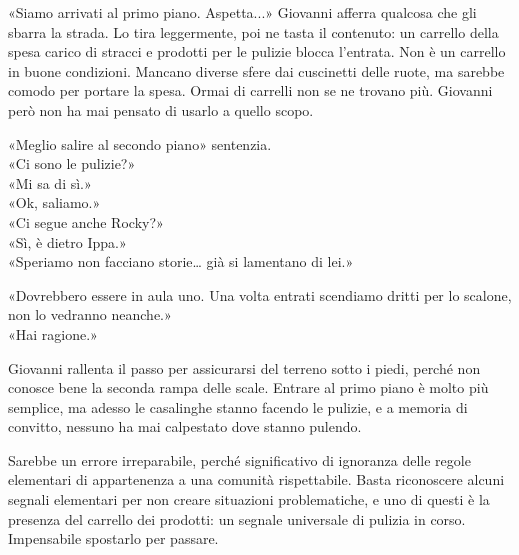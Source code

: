 \par\medskip
«Siamo arrivati al primo piano. Aspetta...» Giovanni afferra qualcosa che gli sbarra la strada. Lo tira leggermente, poi ne tasta il contenuto: un carrello della spesa carico di stracci e prodotti per le pulizie blocca l’entrata.
Non \`e un carrello in buone condizioni. Mancano diverse sfere dai cuscinetti delle ruote, ma sarebbe comodo per portare la spesa. Ormai di carrelli non se ne trovano pi\`u. Giovanni per\`o non ha mai pensato di usarlo a quello scopo.

\par\medskip
«Meglio salire al secondo piano» sentenzia.\\
«Ci sono le pulizie?»\\
«Mi sa di sì.»\\
«Ok, saliamo.»\\
«Ci segue anche Rocky?»\\
«Sì, \`e dietro Ippa.»\\
«Speriamo non facciano storie… gi\`a si lamentano di lei.»

\par\medskip
«Dovrebbero essere in aula uno. Una volta entrati scendiamo dritti per lo scalone, non lo vedranno neanche.»\\
«Hai ragione.»

\par\medskip
Giovanni rallenta il passo per assicurarsi del terreno sotto i piedi, perch\'e non conosce bene la seconda rampa delle scale. Entrare al primo piano \`e molto pi\`u semplice, ma adesso le casalinghe stanno facendo le pulizie, e a memoria di convitto, nessuno ha mai calpestato dove  stanno pulendo.

\par\medskip
Sarebbe un errore irreparabile, perch\'e significativo di ignoranza delle regole elementari di appartenenza a una comunità rispettabile. Basta riconoscere alcuni segnali elementari per non creare situazioni problematiche, e uno di questi \`e la presenza del carrello dei prodotti: un segnale universale di pulizia in corso. Impensabile spostarlo per passare.
